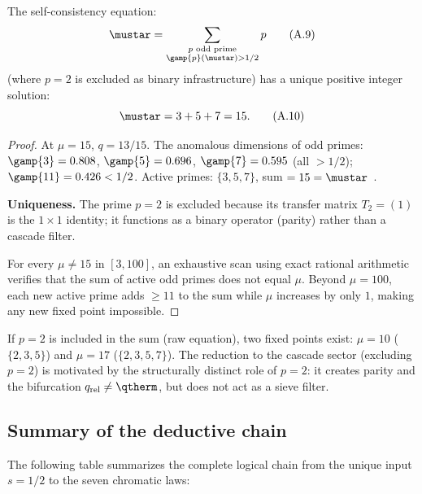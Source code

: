 \documentclass[12pt,a4paper]{article}
\providecommand{\qrel}{\ensuremath{q_{\mathrm{rel}}}}
\begin{document}
\begin{theorembox}
The self-consistency equation:
\begin{equation}
  \mustar = \sum_{\substack{p \text{ odd prime} \\
  \gamp{p}(\mustar) > 1/2}} p
  \tag{A.9}
\end{equation}
(where $p = 2$ is excluded as binary infrastructure) has a unique
positive integer solution:
\begin{equation}
  \mustar = 3 + 5 + 7 = 15.
  \tag{A.10}
\end{equation}

\begin{proof}
At $\mu = 15$, $q = 13/15$. The anomalous dimensions of odd primes:
$\gamp{3} = 0.808$, $\gamp{5} = 0.696$, $\gamp{7} = 0.595$ (all
$> 1/2$); $\gamp{11} = 0.426 < 1/2$. Active primes: $\{3,5,7\}$,
sum $= 15 = \mustar$~\checkmark.

\textbf{Uniqueness.}
The prime $p = 2$ is excluded because its transfer matrix
$T_2 = (1)$ is the $1 \times 1$ identity; it functions as a binary
operator (parity) rather than a cascade filter.

For every $\mu \neq 15$ in $[3, 100]$, an exhaustive scan using exact
rational arithmetic verifies that the sum of active odd primes does not
equal $\mu$. Beyond $\mu = 100$, each new active prime adds $\geq 11$
to the sum while $\mu$ increases by only $1$, making any new fixed
point impossible.
\end{proof}
\end{theorembox}

\begin{remark}
If $p = 2$ is included in the sum (raw equation), two fixed points
exist: $\mu = 10$ ($\{2,3,5\}$) and $\mu = 17$ ($\{2,3,5,7\}$).
The reduction to the cascade sector (excluding $p = 2$) is motivated
by the structurally distinct role of $p = 2$: it creates parity and
the bifurcation $\qrel \neq \qtherm$, but does not act as a sieve
filter.
\end{remark}

\subsection{Summary of the deductive chain}
\label{app:summary}

The following table summarizes the complete logical chain from the
unique input $s = 1/2$ to the seven chromatic laws:
\end{document}
